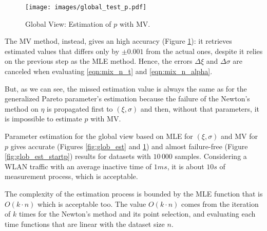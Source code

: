 \begin{figure}[!htbp]
	\begin{center}
		\texttt{[image: images/global\_test\_p.pdf]}
	\end{center}
	\caption{Global View: Estimation of $p$ with \ac{MV}.}
	\label{fig:glob_est_p}
\end{figure}

The \ac{MV} method, instead, gives an high accuracy (Figure \ref{fig:glob_est_p}): it retrieves estimated values that differs only by $\pm 0.001$ from the actual ones, despite it relies on the previous step as the \ac{MLE} method. Hence, the errors $\Delta \xi$ and $\Delta \sigma$ are canceled when evaluating \eqref{eqn:mix_n_t} and \eqref{eqn:mix_n_alpha}.

But, as we can see, the missed estimation value is always the same as for the generalized Pareto parameter's estimation because the failure of the Newton's method on $\eta$ is propagated first to $(\xi, \sigma)$ and then, without that parameters, it is impossible to estimate $p$ with \ac{MV}.

Parameter estimation for the global view based on \ac{MLE} for $(\xi, \sigma)$ and \ac{MV} for $p$ gives accurate (Figures \ref{fig:glob_est} and \ref{fig:glob_est_p}) and almost failure-free (Figure \ref{fig:glob_est_startp}) results for datasets with $10\,000$ samples. Considering a \ac{WLAN} traffic with an average inactive time of $1 ms$, it is about $10 s$ of measurement process, which is acceptable.

The complexity of the estimation process is bounded by the \ac{MLE} function that is $O(k\cdot n)$ which is acceptable too. The value $O(k\cdot n)$ comes from the iteration of $k$ times for the Newton's method and its point selection, and evaluating each time functions that are linear with the dataset size $n$.
